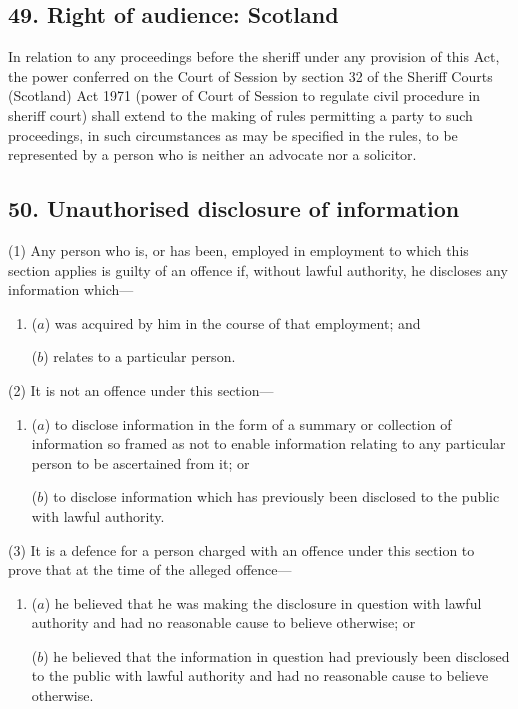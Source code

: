 \documentclass[12pt,a4paper]{article}
\begin{document}

\subsection{49. Right of audience: Scotland}

In relation to any proceedings before the sheriff under any provision of this Act, the power conferred on the Court of Session by section 32 of the Sheriff Courts (Scotland) Act 1971 (power of Court of Session to regulate civil procedure in sheriff court) shall extend to the making of rules permitting a party to such proceedings, in such circumstances as may be specified in the rules, to be represented by a person who is neither an advocate nor a solicitor.


\subsection{50. Unauthorised disclosure of information}

(1) Any person who is, or has been, employed in employment to which this section applies is guilty of an offence if, without lawful authority, he discloses any information which—
\begin{enumerate}\item[]
($a$) was acquired by him in the course of that employment; and

($b$) relates to a particular person.
\end{enumerate}

(2) It is not an offence under this section—
\begin{enumerate}\item[]
($a$) to disclose information in the form of a summary or collection of information so framed as not to enable information relating to any particular person to be ascertained from it; or

($b$) to disclose information which has previously been disclosed to the public with lawful authority.
\end{enumerate}

(3) It is a defence for a person charged with an offence under this section to prove that at the time of the alleged offence—
\begin{enumerate}\item[]
($a$) he believed that he was making the disclosure in question with lawful authority and had no reasonable cause to believe otherwise; or

($b$) he believed that the information in question had previously been disclosed to the public with lawful authority and had no reasonable cause to believe otherwise.
\end{enumerate}
\end{document}
